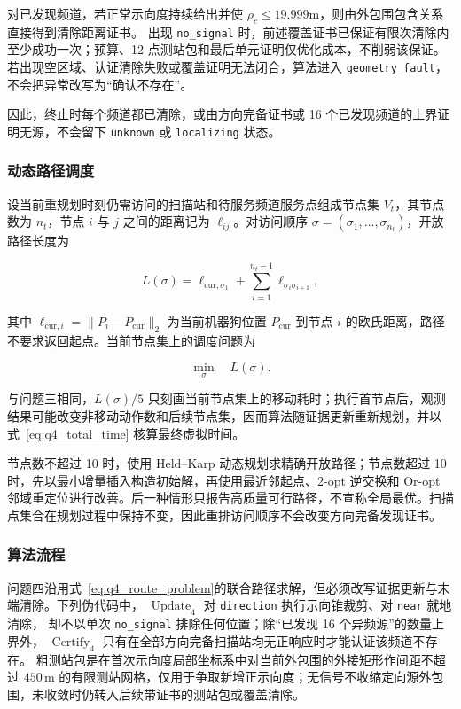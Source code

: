 对已发现频道，若正常示向度持续给出并使 $\rho_c\le19.999\mathrm{m}$，则由外包围包含关系直接得到清除距离证书。
出现 \texttt{no\_signal} 时，前述覆盖证书已保证有限次清除内至少成功一次；预算、12 点测站包和最后单元证明仅优化成本，不削弱该保证。
若出现空区域、认证清除失败或覆盖证明无法闭合，算法进入 \texttt{geometry\_fault}，不会把异常改写为“确认不存在”。

因此，终止时每个频道都已清除，或由方向完备证书或 16 个已发现频道的上界证明无源，不会留下 \texttt{unknown} 或 \texttt{localizing} 状态。

\subsubsection{动态路径调度}

设当前重规划时刻仍需访问的扫描站和待服务频道服务点组成节点集 $V_t$，其节点数为 $n_t$，节点 $i$ 与 $j$ 之间的距离记为 $\ell_{ij}$。对访问顺序 $\sigma=(\sigma_1,\ldots,\sigma_{n_t})$，开放路径长度为

\begin{equation}
L(\sigma)=
\ell_{\mathrm{cur},\sigma_1}
+
\sum_{i=1}^{n_t-1}
\ell_{\sigma_i\sigma_{i+1}},
\label{eq:q4_open_path}
\end{equation}

其中 $\ell_{\mathrm{cur},i}=\lVert P_i-P_{\mathrm{cur}}\rVert_2$ 为当前机器狗位置 $P_{\mathrm{cur}}$ 到节点 $i$ 的欧氏距离，路径不要求返回起点。当前节点集上的调度问题为

\begin{equation}
\min_{\sigma}\quad L(\sigma).
\label{eq:q4_route_problem}
\end{equation}

与问题三相同，$L(\sigma)/5$ 只刻画当前节点集上的移动耗时；执行首节点后，观测结果可能改变非移动动作数和后续节点集，因而算法随证据更新重新规划，并以式~\eqref{eq:q4_total_time} 核算最终虚拟时间。

节点数不超过 10 时，使用 Held--Karp 动态规划求精确开放路径；节点数超过 10 时，先以最小增量插入构造初始解，再使用最近邻起点、2-opt 逆交换和 Or-opt 邻域重定位进行改善。后一种情形只报告高质量可行路径，不宣称全局最优。扫描点集合在规划过程中保持不变，因此重排访问顺序不会改变方向完备发现证书。

\subsubsection{算法流程}

问题四沿用式~\eqref{eq:q4_route_problem}的联合路径求解，但必须改写证据更新与末端清除。下列伪代码中，
$\operatorname{Update}_4$ 对 \texttt{direction} 执行示向锥裁剪、对 \texttt{near} 就地清除，
却不以单次 \texttt{no\_signal} 排除任何位置；除“已发现 16 个异频源”的数量上界外，
$\operatorname{Certify}_4$ 只有在全部方向完备扫描站均无正响应时才能认证该频道不存在。
粗测站包是在首次示向度局部坐标系中对当前外包围的外接矩形作间距不超过 $450\,\mathrm m$ 的有限测站网格，仅用于争取新增正示向度；无信号不收缩定向源外包围，未收敛时仍转入后续带证书的测站包或覆盖清除。


